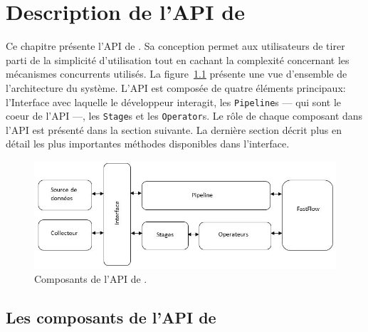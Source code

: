 
\chapter{Description de l'API de \PpFf}
\label{description.chap}


Ce chapitre pr\'esente l'API de \ppff. Sa conception permet aux utilisateurs de tirer parti de la simplicit\'e d'utilisation tout en cachant la complexit\'e concernant les m\'ecanismes concurrents utilis\'es. La figure~\ref{ComponentsAPI.fig} pr\'esente une vue d'ensemble de l'architecture du syst\`eme. L'API est compos\'ee de quatre \'el\'ements principaux: l'Interface avec laquelle le d\'eveloppeur interagit, les \texttt{Pipeline}s --- qui sont le coeur de l'API ---, les \texttt{Stage}s et les \texttt{Operator}s. Le r\^ole de chaque composant dans l'API est pr\'esent\'e dans la section suivante. La derni\`ere section  d\'ecrit plus en d\'etail les plus importantes m\'ethodes disponibles dans l'interface.



\begin{figure}[ht]
\centering
     \includegraphics[width=1.0\textwidth]{Figures/ComponentsAPI.jpg}
      \caption{Composants de l'API de \ppff.}
       \label{ComponentsAPI.fig}
\end{figure}


\section{Les composants de l'API de \ppff}




